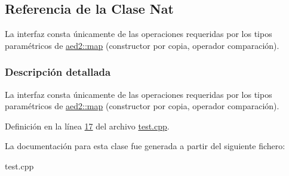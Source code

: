 \hypertarget{classNat}{\subsection{\-Referencia de la \-Clase \-Nat}
\label{classNat}
}


\-La interfaz consta únicamente de las operaciones requeridas por los tipos paramétricos de \hyperlink{classaed2_1_1map}{aed2\-::map} (constructor por copia, operador comparación).  




\subsubsection{\-Descripción detallada}
\-La interfaz consta únicamente de las operaciones requeridas por los tipos paramétricos de \hyperlink{classaed2_1_1map}{aed2\-::map} (constructor por copia, operador comparación). 

\-Definición en la línea \hyperlink{test_8cpp_source_l00017}{17} del archivo \hyperlink{test_8cpp_source}{test.\-cpp}.



\-La documentación para esta clase fue generada a partir del siguiente fichero\-:\begin{DoxyCompactItemize}
\item 
test.\-cpp\end{DoxyCompactItemize}
